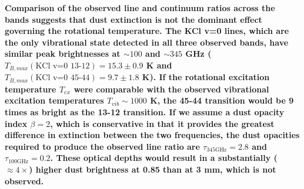 \documentclass[twocolumn]{aastex62}
\newcommand{\referee}[1]{\textbf{#1}}
\begin{document}
\referee{
Comparison of the observed line and continuum ratios across the bands suggests
that dust extinction is not the dominant effect governing the rotational
temperature.
The KCl v=0 lines, which are the only vibrational state detected in all three observed
bands, have similar peak brightnesses at $\sim100$ and $\sim345$ GHz
($T_{B,max}(\textrm{KCl v=0 13-12}) = 15.3\pm0.9$ K and $T_{B,max}(\textrm{KCl
v=0 45-44}) = 9.7\pm1.8$ K).  
If the rotational excitation temperature $T_{ex}$ were comparable
with the observed vibrational excitation temperatures $T_{vib} \sim 1000$ K, 
the 45-44 transition would be 9 times as bright as the 13-12 transition.
If we assume a dust opacity index $\beta=2$,
which is conservative in that it provides the greatest difference in extinction
between the two frequencies, the dust opacities required to produce the observed line ratio
are $\tau_{345 \textrm{GHz}} = 2.8$ and $\tau_{100 \textrm{GHz}} = 0.2$.  These optical
depths  would result in a substantially ($\approx4\times$) higher 
dust brightness at 0.85 \um than at 3 mm, which is not observed.
}


\end{document}
